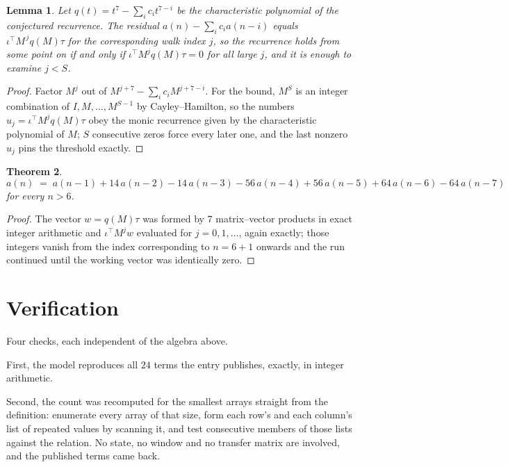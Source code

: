 \documentclass[11pt,a4paper]{article}
\theoremstyle{plain}
\newtheorem{theorem}{Theorem}
\newtheorem{lemma}[theorem]{Lemma}
\theoremstyle{definition}
\begin{document}
\begin{lemma}\label{lem:crit}
Let $q(t)=t^{7}-\sum_i c_it^{7-i}$ be the characteristic polynomial of the
conjectured recurrence. The residual $a(n)-\sum_ic_ia(n-i)$ equals
$\iota^{\!\top}M^{\,j}q(M)\tau$ for the corresponding walk index $j$, so the recurrence
holds from some point on if and only if $\iota^{\!\top}M^{j}q(M)\tau=0$ for all large $j$,
and it is enough to examine $j<S$.
\end{lemma}

\begin{proof}
Factor $M^{j}$ out of $M^{j+7}-\sum_ic_iM^{j+7-i}$. For the bound, $M^{S}$
is an integer combination of $I,M,\dots,M^{S-1}$ by Cayley--Hamilton, so the numbers
$u_j=\iota^{\!\top}M^{j}q(M)\tau$ obey the monic recurrence given by the characteristic
polynomial of $M$; $S$ consecutive zeros force every later one, and the last nonzero $u_j$
pins the threshold exactly.
\end{proof}

\begin{theorem}
\[
a(n)\;=\;a(n-1) + 14\,a(n-2) - 14\,a(n-3) - 56\,a(n-4) + 56\,a(n-5) + 64\,a(n-6) - 64\,a(n-7)
\]
for every $n>6$.
\end{theorem}

\begin{proof}
The vector $w=q(M)\tau$ was formed by $7$ matrix--vector products in exact integer
arithmetic and $\iota^{\!\top}M^{j}w$ evaluated for $j=0,1,\dots$, again exactly; those
integers vanish from the index corresponding to $n=6+1$ onwards and the run continued
until the working vector was identically zero.
\end{proof}

\section{Verification}

Four checks, each independent of the algebra above.

First, the model reproduces all $24$ terms the entry publishes, exactly, in integer
arithmetic.

Second, the count was recomputed for the smallest arrays straight from the definition:
enumerate every array of that size, form each row's and each column's list of repeated values
by scanning it, and test consecutive members of those lists against the relation. No state, no
window and no transfer matrix are involved, and the published terms came back.
\end{document}
